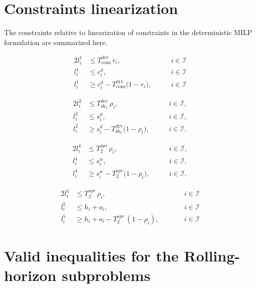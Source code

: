 \documentclass[preprint,12pt,3p]{elsarticle}
\begin{document}
\appendix
\section{Constraints linearization} \label{section:appendix1}
The constraints relative to linearization of constraints in the deterministic MILP formulation are summarized here.

\begin{alignat}{2}
    l_i^1 &\leq T^{\mathrm{drv}}_{\mathrm{cons}}\, r_i,
    &\quad& \, i \in \mathcal{I} \label{eq:l1_ub1}\\
    l_i^1 &\leq c_i^d,
    &\quad& \, i \in \mathcal{I} \label{eq:l1_ub2}\\
    l_i^1 &\geq c_i^d - T^{\mathrm{drv}}_{\mathrm{cons}}\bigl(1-r_i\bigr),
    &\quad& \, i \in \mathcal{I} \label{eq:l1_lb}
\end{alignat}



\begin{alignat}{2}
    l_i^2 &\leq T^{\mathrm{drv}}_{\mathrm{sh_2}}\, \rho_i,
    &\quad& \, i \in \mathcal{I}, \label{eq:l2_ub1}\\
    l_i^2 &\leq s_i^d,
    &\quad& \, i \in \mathcal{I}, \label{eq:l2_ub2}\\
    l_i^2 &\geq s_i^d - T^{\mathrm{drv}}_{\mathrm{sh_2}}\bigl(1-\rho_i\bigr),
    &\quad& \, i \in \mathcal{I}. \label{eq:l2_lb}
\end{alignat}




\begin{alignat}{2}
    l_i^4 &\leq T^{spr}_{2}\, \rho_i,
    &\quad& \, i \in \mathcal{I}, \label{eq:l4_ub1}\\
    l_i^4 &\leq s_i^w,
    &\quad& \, i \in \mathcal{I}, \label{eq:l4_ub2}\\
    l_i^4 &\geq s_i^w - T^{spr}_{2}\bigl(1-\rho_i\bigr),
    &\quad& \, i \in \mathcal{I}. \label{eq:l4_lb}
\end{alignat}


\begin{alignat}{2}
    l^5_i &\leq T^{spr}_2\, \rho_i, &\qquad& i \in \mathcal I \label{eq:l5_1}\\
    l^5_i &\leq h_i + o_i, &\qquad& i \in \mathcal I \label{eq:l5_2}\\
    l^5_i &\geq h_i + o_i - T^{spr}_2\,(1 - \rho_i), &\qquad& i \in \mathcal I \label{eq:l5_3}
\end{alignat}


\section{Valid inequalities for the Rolling-horizon subproblems} \label{sec:valid_inequ}
\end{document}
